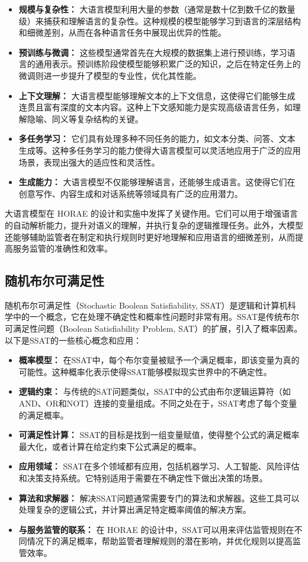 \begin{itemize}
    \item \textbf{规模与复杂性：} 大语言模型利用大量的参数\cite{wei2022emergent}（通常是数十亿到数千亿的数量级）来捕获和理解语言的复杂性。这种规模的模型能够学习到语言的深层结构和细微差别，从而在各种语言任务中展现出优异的性能。
    \item \textbf{预训练与微调：} 这些模型通常首先在大规模的数据集上进行预训练，学习语言的通用表示。预训练阶段使模型能够积累广泛的知识，之后在特定任务上的微调则进一步提升了模型的专业性，优化其性能。
    \item \textbf{上下文理解：} 大语言模型能够理解文本的上下文信息，这使得它们能够生成连贯且富有深度的文本内容。这种上下文感知能力是实现高级语言任务，如理解隐喻、同义等复杂结构的关键。
    \item \textbf{多任务学习：} 它们具有处理多种不同任务的能力，如文本分类、问答、文本生成等。这种多任务学习的能力使得大语言模型可以灵活地应用于广泛的应用场景，表现出强大的适应性和灵活性。
    \item \textbf{生成能力：} 大语言模型不仅能够理解语言，还能够生成语言。这使得它们在创意写作、内容生成和对话系统等领域具有广泛的应用潜力。
\end{itemize}

大语言模型在 HORAE 的设计和实施中发挥了关键作用。它们可以用于增强语言的自动解析能力，提升对语义的理解，并执行复杂的逻辑推理任务。此外，大模型还能够辅助监管者在制定和执行规则时更好地理解和应用语言的细微差别，从而提高服务监管的准确性和效率。

\subsection{随机布尔可满足性}
随机布尔可满足性\cite{chen2021sharp}（Stochastic Boolean Satisfiability, SSAT）是逻辑和计算机科学中的一个概念，它在处理不确定性和概率性问题时非常有用。SSAT是传统布尔可满足性问题\cite{alyahya2022structure}（Boolean Satisfiability Problem, SAT）的扩展，引入了概率因素。以下是SSAT的一些核心概念和应用：

\begin{itemize}
    \item \textbf{概率模型：} 在SSAT中，每个布尔变量被赋予一个满足概率，即该变量为真的可能性。这种概率化表示使得SSAT能够模拟现实世界中的不确定性。
    \item \textbf{逻辑约束：} 与传统的SAT问题类似，SSAT中的公式由布尔逻辑运算符（如AND、OR和NOT）连接的变量组成。不同之处在于，SSAT考虑了每个变量的满足概率。
    \item \textbf{可满足性计算：} SSAT的目标是找到一组变量赋值，使得整个公式的满足概率最大化，或者计算在给定约束下公式满足的概率。
    \item \textbf{应用领域：} SSAT在多个领域都有应用，包括机器学习、人工智能、风险评估和决策支持系统。它特别适用于需要在不确定性下做出决策的场景。
    \item \textbf{算法和求解器：} 解决SSAT问题通常需要专门的算法和求解器。这些工具可以处理复杂的逻辑公式，并计算出满足特定概率阈值的解决方案。
    \item \textbf{与服务监管的联系：} 在 HORAE 的设计中，SSAT可以用来评估监管规则在不同情况下的满足概率，帮助监管者理解规则的潜在影响，并优化规则以提高监管效率。
\end{itemize}

